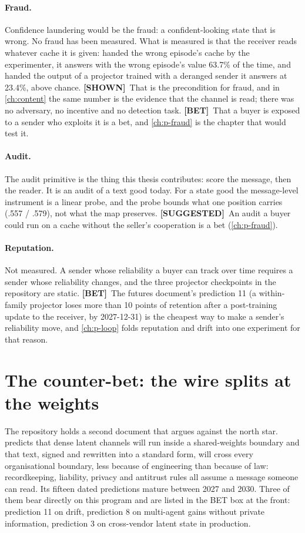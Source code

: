 \documentclass[11pt,a4paper]{report}
\newcommand{\SHOWN}{\textcolor{shownc}{\textbf{\scriptsize[SHOWN]}}}
\newcommand{\SUGG}{\textcolor{suggc}{\textbf{\scriptsize[SUGGESTED]}}}
\newcommand{\BET}{\textcolor{betc}{\textbf{\scriptsize[BET]}}}
\begin{document}
\paragraph{Fraud.} Confidence laundering would be the fraud: a confident-looking state that is wrong. No fraud has been measured. What is measured is that the receiver reads whatever cache it is given: handed the wrong episode's cache by the experimenter, it answers with the wrong episode's value 63.7\% of the time, and handed the output of a projector trained with a deranged sender it answers at 23.4\%, above chance. \SHOWN\ That is the precondition for fraud, and in \cref{ch:content} the same number is the evidence that the channel is read; there was no adversary, no incentive and no detection task. \BET\ That a buyer is exposed to a sender who exploits it is a bet, and \cref{ch:p-fraud} is the chapter that would test it.

\paragraph{Audit.} The audit primitive is the thing this thesis contributes: score the message, then the reader. It is an audit of a text good today. For a state good the message-level instrument is a linear probe, and the probe bounds what one position carries (.557 / .579), not what the map preserves. \SUGG\ An audit a buyer could run on a cache without the seller's cooperation is a bet (\cref{ch:p-fraud}).

\paragraph{Reputation.} Not measured. A sender whose reliability a buyer can track over time requires a sender whose reliability changes, and the three projector checkpoints in the repository are static. \BET\ The futures document's prediction 11 (a within-family projector loses more than 10 points of retention after a post-training update to the receiver, by 2027-12-31) is the cheapest way to make a sender's reliability move, and \cref{ch:p-loop} folds reputation and drift into one experiment for that reason.

\section{The counter-bet: the wire splits at the weights}

The repository holds a second document that argues against the north star.  predicts that dense latent channels will run inside a shared-weights boundary and that text, signed and rewritten into a standard form, will cross every organisational boundary, less because of engineering than because of law: recordkeeping, liability, privacy and antitrust rules all assume a message someone can read. Its fifteen dated predictions mature between 2027 and 2030. Three of them bear directly on this program and are listed in the BET box at the front: prediction 11 on drift, prediction 8 on multi-agent gains without private information, prediction 3 on cross-vendor latent state in production.
\end{document}
